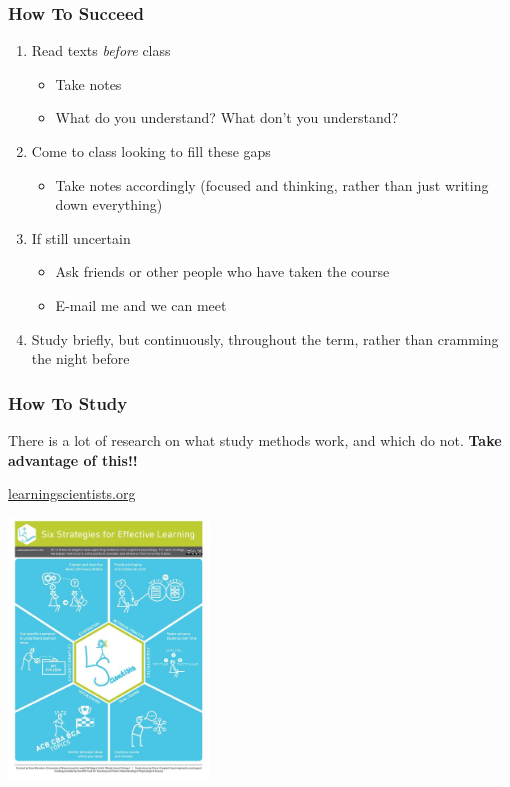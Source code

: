 \documentclass[10pt]{beamer}
\begin{document}
\begin{frame}[t]
\frametitle{How To Succeed}
\vspace{0.5cm}

	\begin{enumerate}
		\item Read texts \emph{before} class
			\begin{itemize}
				\item Take notes
				\item What do you understand? What don't you understand?
			\end{itemize}
		\item Come to class looking to fill these gaps
			\begin{itemize}
				\item Take notes accordingly (focused and thinking, rather than just writing down everything)
			\end{itemize}	
		\item If still uncertain
			\begin{itemize}
				\item Ask friends or other people who have taken the course
				\item E-mail me and we can meet
			\end{itemize}	
		\item Study briefly, but continuously, throughout the term, rather than cramming the night before	
	\end{enumerate}
\end{frame}


\begin{frame}[t]
\frametitle{How To Study}
\vspace{0.5cm}
There is a lot of research on what study methods work, and which do not. \textbf{Take advantage of this!!}

	\begin{center}
		\href{http://www.learningscientists.org/videos}{\textcolor{myblue}{learningscientists.org}}
		
		\vspace{0.5cm}
		
		\includegraphics[width=0.4\textwidth]{figures/learning.jpg}
	\end{center}
\end{frame}
\end{document}
